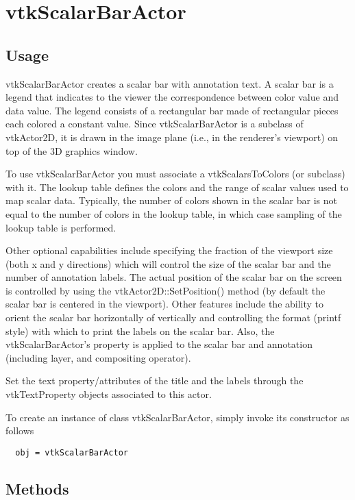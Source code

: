\section{vtkScalarBarActor}

\subsection{Usage}

 vtkScalarBarActor creates a scalar bar with annotation text. A scalar
 bar is a legend that indicates to the viewer the correspondence between
 color value and data value. The legend consists of a rectangular bar 
 made of rectangular pieces each colored a constant value. Since 
 vtkScalarBarActor is a subclass of vtkActor2D, it is drawn in the image 
 plane (i.e., in the renderer's viewport) on top of the 3D graphics window.

 To use vtkScalarBarActor you must associate a vtkScalarsToColors (or
 subclass) with it. The lookup table defines the colors and the
 range of scalar values used to map scalar data.  Typically, the
 number of colors shown in the scalar bar is not equal to the number
 of colors in the lookup table, in which case sampling of
 the lookup table is performed. 

 Other optional capabilities include specifying the fraction of the
 viewport size (both x and y directions) which will control the size
 of the scalar bar and the number of annotation labels. The actual position
 of the scalar bar on the screen is controlled by using the
 vtkActor2D::SetPosition() method (by default the scalar bar is
 centered in the viewport).  Other features include the ability to
 orient the scalar bar horizontally of vertically and controlling
 the format (printf style) with which to print the labels on the
 scalar bar. Also, the vtkScalarBarActor's property is applied to
 the scalar bar and annotation (including layer, and
 compositing operator).

 Set the text property/attributes of the title and the labels through the 
 vtkTextProperty objects associated to this actor.


To create an instance of class vtkScalarBarActor, simply
invoke its constructor as follows
\begin{verbatim}
  obj = vtkScalarBarActor
\end{verbatim}
\subsection{Methods}

